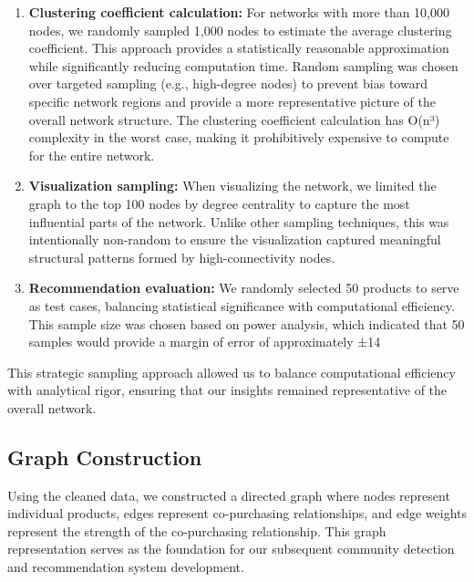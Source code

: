 \documentclass[conference]{IEEEtran}
\begin{document}
\begin{enumerate}
    \item \textbf{Clustering coefficient calculation:} For networks with more than 10,000 nodes, we randomly sampled 1,000 nodes to estimate the average clustering coefficient. This approach provides a statistically reasonable approximation while significantly reducing computation time. Random sampling was chosen over targeted sampling (e.g., high-degree nodes) to prevent bias toward specific network regions and provide a more representative picture of the overall network structure. The clustering coefficient calculation has O(n³) complexity in the worst case, making it prohibitively expensive to compute for the entire network.
    
    \item \textbf{Visualization sampling:} When visualizing the network, we limited the graph to the top 100 nodes by degree centrality to capture the most influential parts of the network. Unlike other sampling techniques, this was intentionally non-random to ensure the visualization captured meaningful structural patterns formed by high-connectivity nodes.
    
    \item \textbf{Recommendation evaluation:} We randomly selected 50 products to serve as test cases, balancing statistical significance with computational efficiency. This sample size was chosen based on power analysis, which indicated that 50 samples would provide a margin of error of approximately ±14%
\end{enumerate}

This strategic sampling approach allowed us to balance computational efficiency with analytical rigor, ensuring that our insights remained representative of the overall network.

\subsection{Graph Construction}
Using the cleaned data, we constructed a directed graph where nodes represent individual products, edges represent co-purchasing relationships, and edge weights represent the strength of the co-purchasing relationship. This graph representation serves as the foundation for our subsequent community detection and recommendation system development.
\end{document}
